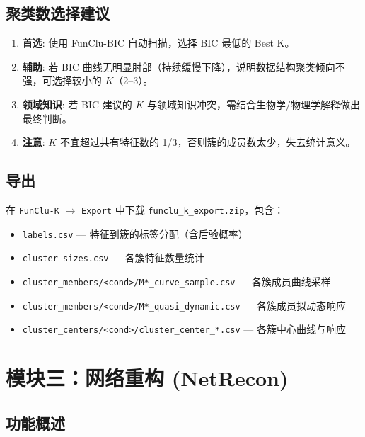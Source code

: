 \documentclass[12pt,a4paper]{ctexart}
\newcommand{\tab}[1]{\texttt{#1}}
\newcommand{\file}[1]{\texttt{#1}}
\begin{document}
\subsection{聚类数选择建议}

\begin{infobox}[如何选择 $K$]
    \begin{enumerate}[leftmargin=*]
        \item \textbf{首选}: 使用 FunClu-BIC 自动扫描，选择 BIC 最低的 Best K。
        \item \textbf{辅助}: 若 BIC 曲线无明显肘部（持续缓慢下降），说明数据结构聚类倾向不强，可选择较小的 $K$（2--3）。
        \item \textbf{领域知识}: 若 BIC 建议的 $K$ 与领域知识冲突，需结合生物学/物理学解释做出最终判断。
        \item \textbf{注意}: $K$ 不宜超过共有特征数的 1/3，否则簇的成员数太少，失去统计意义。
    \end{enumerate}
\end{infobox}

\subsection{导出}

在 \tab{FunClu-K} $\rightarrow$ \tab{Export} 中下载 \file{funclu\_k\_export.zip}，包含：

\begin{itemize}[leftmargin=*]
    \item \file{labels.csv} --- 特征到簇的标签分配（含后验概率）
    \item \file{cluster\_sizes.csv} --- 各簇特征数量统计
    \item \file{cluster\_members/<cond>/M*\_curve\_sample.csv} --- 各簇成员曲线采样
    \item \file{cluster\_members/<cond>/M*\_quasi\_dynamic.csv} --- 各簇成员拟动态响应
    \item \file{cluster\_centers/<cond>/cluster\_center\_*.csv} --- 各簇中心曲线与响应
\end{itemize}

\section{模块三：网络重构 (NetRecon)}

\subsection{功能概述}
\end{document}
